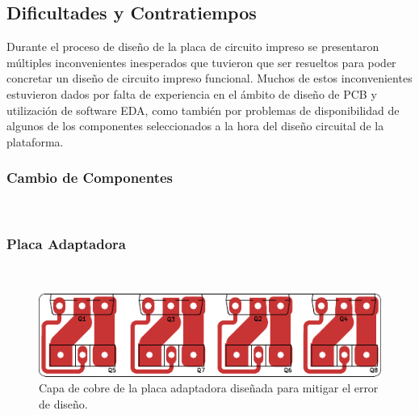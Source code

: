 \subsection{Dificultades y Contratiempos}

Durante el proceso de diseño de la placa de circuito impreso se presentaron múltiples inconvenientes inesperados que tuvieron que ser resueltos para poder concretar un diseño de circuito impreso funcional. Muchos de estos inconvenientes estuvieron dados por falta de experiencia en el ámbito de diseño de PCB y utilización de software EDA, como también por problemas de disponibilidad de algunos de los componentes seleccionados a la hora del diseño circuital de la plataforma.\\

\subsubsection{Cambio de Componentes}

\lipsum[1]\\

\subsubsection{Placa Adaptadora}

\lipsum[2]\\

\begin{figure}[h]
    \centering
    \includegraphics[scale=1.3]{Imagenes/Placa Adaptadora.pdf}
    \caption{Capa de cobre de la placa adaptadora diseñada para mitigar el error de diseño.}
    \label{fig:placa_adaptadora}
\end{figure}